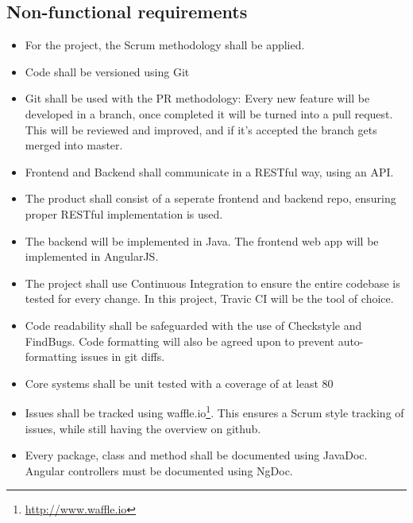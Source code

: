 \subsection{Non-functional requirements}
\begin{itemize}

\item For the project, the Scrum methodology shall be applied.

\item Code shall be versioned using Git

\item Git shall be used with the PR methodology: Every new feature will be developed in a branch, once completed it will be turned into a pull request. This will be reviewed and improved, and if it's accepted the branch gets merged into master.

\item Frontend and Backend shall communicate in a RESTful way, using an API.

\item The product shall consist of a seperate frontend and backend repo, ensuring proper RESTful implementation is used.

\item The backend will be implemented in Java. The frontend web app will be implemented in AngularJS. 

\item The project shall use Continuous Integration to ensure the entire codebase is tested for every change. In this project, Travic CI will be the tool of choice.

\item Code readability shall be safeguarded with the use of Checkstyle and FindBugs. Code formatting will also be agreed upon to prevent auto-formatting issues in git diffs.

\item Core systems shall be unit tested with a coverage of at least 80%

\item Issues shall be tracked using waffle.io\footnote{\url{http://www.waffle.io}}. This ensures a Scrum style tracking of issues, while still having the overview on github.

\item Every package, class and method shall be documented using JavaDoc. Angular controllers must be documented using NgDoc. 

\end{itemize}